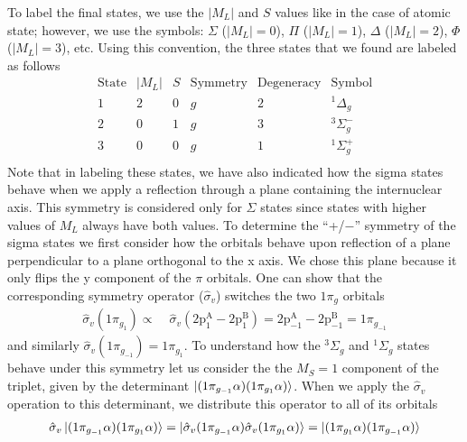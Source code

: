 \documentclass[../Main/chem532-notes.tex]{subfiles}
\begin{document}
\begin{example}
To label the final states, we use the $|M_L|$ and $S$ values like in the case of atomic state; however, we use the symbols: $\Sigma$ ($|M_L| = 0$), $\Pi$ ($|M_L| = 1$), $\Delta$ ($|M_L| = 2$), $\Phi$ ($|M_L| = 3$), etc.
Using this convention, the three states that we found are labeled as follows
\begin{equation*}
\begin{array}{r|llccc}
    \text{State} & |M_L| & S & \text{Symmetry} & \text{Degeneracy} &  \text{Symbol} \\
    \hline
1 & 2 & 0 & g & 2 & {^1}\Delta_g \\
2 & 0 & 1 & g & 3 & {^3}\Sigma_g^{-} \\
3 & 0 & 0 & g & 1 & {^1}\Sigma_g^{+} \\
\end{array}
\end{equation*}
Note that in labeling these states, we have also indicated how the sigma states behave when we apply a reflection through a plane containing the internuclear axis.
This symmetry is considered only for $\Sigma$ states since states with higher values of $M_L$ always have both values.
To determine the ``+/$-$'' symmetry of the sigma states we first consider how the orbitals behave upon reflection of a plane perpendicular to a plane orthogonal to the x axis.
We chose this plane because it only flips the y component of the $\pi$ orbitals. One can show that the corresponding symmetry operator ($\hat{\sigma}_v$) switches the two $1\pi_{g}$ orbitals
\begin{equation}
\begin{split}
\hat{\sigma}_v (1\pi_{g_1})  \propto & \; \hat{\sigma}_v (\mathrm{2p_1^A - 2p_1^B}) = \mathrm{2p_{-1}^A - 2p_{-1}^B} = 1\pi_{g_{-1}}\end{split}
\end{equation}
and similarly $\hat{\sigma}_v (1\pi_{g_{-1}}) = 1\pi_{g_1}$.
To understand how the $ {^3}\Sigma_g$ and ${^1}\Sigma_g$ states behave under this symmetry let us consider the the $M_S = 1$ component of the triplet, given by the determinant $\ket{(1\pi_{g_{-1}} \alpha) (1\pi_{g_{1}} \alpha)}$.
When we apply the $\hat{\sigma}_v$ operation to this determinant, we distribute this operator to all of its orbitals
\begin{equation}
\begin{split}
\hat{\sigma}_v \ket{(1\pi_{g_{-1}} \alpha) (1\pi_{g_{1}} \alpha)}
= \ket{\hat{\sigma}_v(1\pi_{g_{-1}} \alpha) \hat{\sigma}_v(1\pi_{g_{1}} \alpha)}
=  \ket{(1\pi_{g_{1}} \alpha) (1\pi_{g_{-1}} \alpha)}

\end{split}
\end{equation}
\end{example}
\end{document}
